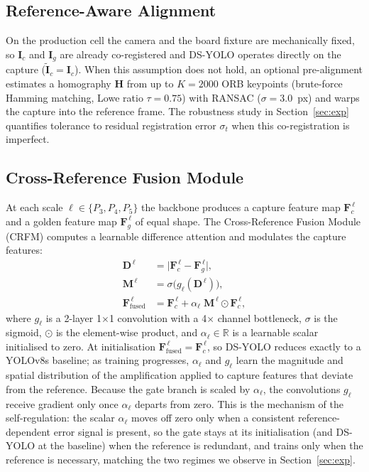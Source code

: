 \documentclass[conference]{IEEEtran}
\newcommand{\R}{\mathbb{R}}
\newcommand{\Igolden}{\mathbf{I}_{\!g}}
\newcommand{\Icap}{\mathbf{I}_{\!c}}
\newcommand{\Ialn}{\tilde{\mathbf{I}}_{\!c}}
\newcommand{\Hmat}{\mathbf{H}}
\begin{document}
\subsection{Reference-Aware Alignment}
On the production cell the camera and the board fixture are mechanically fixed,
so $\Icap$ and $\Igolden$ are already co-registered and DS-YOLO operates
directly on the capture ($\Ialn\!=\!\Icap$). When this assumption does not hold,
an optional pre-alignment estimates a homography $\Hmat$ from up to $K{=}2000$
ORB keypoints (brute-force Hamming matching, Lowe ratio $\tau{=}0.75$) with
RANSAC ($\sigma{=}3.0$~px) and warps the capture into the reference frame. The
robustness study in Section~\ref{sec:exp} quantifies tolerance to residual
registration error $\sigma_t$ when this co-registration is imperfect.

\subsection{Cross-Reference Fusion Module}
\label{sec:crfm}
At each scale $\ell\!\in\!\{P_3,P_4,P_5\}$ the backbone produces a
capture feature map $\mathbf{F}^{\,\ell}_{\!c}$ and a golden feature
map $\mathbf{F}^{\,\ell}_{\!g}$ of equal shape. The Cross-Reference
Fusion Module (CRFM) computes a learnable difference attention and
modulates the capture features:
\begin{align}
\mathbf{D}^{\,\ell} &= \bigl|\mathbf{F}^{\,\ell}_{\!c} - \mathbf{F}^{\,\ell}_{\!g}\bigr|, \\
\mathbf{M}^{\,\ell} &= \sigma\!\bigl(g_{\ell}(\mathbf{D}^{\,\ell})\bigr), \\
\mathbf{F}^{\,\ell}_{\!\text{fused}} &=
   \mathbf{F}^{\,\ell}_{\!c}
   + \alpha_{\ell}\;\mathbf{M}^{\,\ell} \odot \mathbf{F}^{\,\ell}_{\!c},
\label{eq:crfm}
\end{align}
where $g_{\ell}$ is a 2-layer 1$\times$1 convolution with a 4$\times$
channel bottleneck, $\sigma$ is the sigmoid, $\odot$ is the element-wise
product, and $\alpha_{\ell}\in\R$ is a learnable scalar initialised to
zero. At initialisation $\mathbf{F}^{\,\ell}_{\!\text{fused}}\!=\!\mathbf{F}^{\,\ell}_{\!c}$,
so DS-YOLO reduces exactly to a YOLOv8s baseline; as training
progresses, $\alpha_{\ell}$ and $g_{\ell}$ learn the magnitude and spatial
distribution of the amplification applied to capture features that deviate from
the reference. Because the gate branch is scaled by $\alpha_{\ell}$, the
convolutions $g_{\ell}$ receive gradient only once $\alpha_{\ell}$ departs from
zero. This is the mechanism of the self-regulation: the scalar $\alpha_{\ell}$
moves off zero only when a consistent reference-dependent error signal is
present, so the gate stays at its initialisation (and DS-YOLO at the baseline)
when the reference is redundant, and trains only when the reference is
necessary, matching the two regimes we observe in Section~\ref{sec:exp}.
\end{document}
